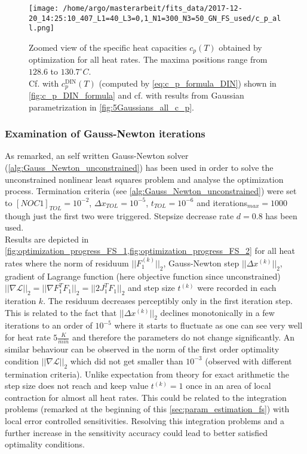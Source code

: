 \documentclass{scrartcl}[12pt, halfparskip]
\numberwithin{equation}{section}
\numberwithin{figure}{section}
\numberwithin{table}{section}
\begin{document}
\begin{figure}[H]
	\centering
	\texttt{[image: /home/argo/masterarbeit/fits\_data/2017-12-20\_14:25:10\_407\_L1=40\_L3=0,1\_N1=300\_N3=50\_GN\_FS\_used/c\_p\_all.png]}
	\caption{Zoomed view of the specific heat capacities $c_p(T)$ obtained by optimization for all heat rates. The maxima positions range from $128.6$ to $130.7^{\circ}C$. \\
	Cf. with $c_p^{\text{DIN}}(T)$ (computed by \cref{eq:c_p_formula_DIN}) shown in \cref{fig:c_p_DIN_formula} and cf. with results from Gaussian parametrization in \cref{fig:5Gaussians_all_c_p}.}
	\label{fig:FS_all_c_p}
\end{figure}

\subsubsection{Examination of Gauss-Newton iterations}
\label{sec:param_estimation_fs_examin_GN}

As remarked, an self written Gauss-Newton solver (\cref{alg:Gauss_Newton_unconstrained}) has been used in order to solve the unconstrained nonlinear least squares problem and analyse the optimization process. Termination criteria (see \cref{alg:Gauss_Newton_unconstrained}) were set to $[NOC1]_{TOL}=10^{-2}$, $\Delta x_{TOL}=10^{-5}$, $t_{TOL}=10^{-6}$ and iterations$_{max}=1000$ though just the first two were triggered. Stepsize decrease rate $d=0.8$ has been used. \\
Results are depicted in \cref{fig:optimization_progress_FS_1,fig:optimization_progress_FS_2} for all heat rates where the norm of residuum $||F_1^{(k)}||_2$, Gauss-Newton step $||\Delta x^{(k)}||_2$, gradient of Lagrange function (here objective function since unconstrained) $|| \nabla \mathcal{L} ||_2 = || \nabla F_1^T F_1 ||_2 = || 2 J_1^T F_1 ||_2$ and step size $t^{(k)}$ were recorded in each iteration $k$. The residuum decreases perceptibly only in the first iteration step. This is related to the fact that $||\Delta x^{(k)}||_2$ declines monotonically in a few iterations to an order of $10^{-5}$ where it starts to fluctuate as one can see very well for heat rate $5 \frac{K}{min}$ and therefore the parameters do not change significantly. 
An similar behaviour can be observed in the norm of the first order optimality condition  $|| \nabla \mathcal{L} ||_2$ which did not get smaller than $10^{-3}$ (observed with different termination criteria).
Unlike expectation from theory for exact arithmetic the step size does not reach and keep value $t^{(k)}=1$ once in an area of local contraction for almost all heat rates. 
This could be related to the integration problems (remarked at the beginning of this \cref{sec:param_estimation_fs}) with local error controlled sensitivities. Resolving this integration problems and a further increase in the sensitivity accuracy could lead to better satisfied optimality conditions.
\end{document}
